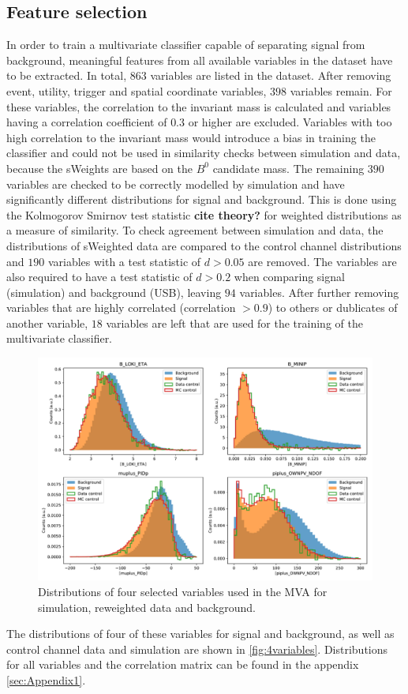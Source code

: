 \subsection{Feature selection}
In order to train a multivariate classifier capable of separating signal from background, meaningful features from all available variables in the dataset 
have to be extracted. In total, $\num{863}$ variables are listed in the dataset. After removing event, utility, trigger and spatial coordinate variables, $\num{398}$ variables remain.
For these variables, the correlation to the invariant mass is calculated and variables having a correlation coefficient of $\num{0.3}$ or higher are excluded.
Variables with too high correlation to the invariant mass would introduce a bias in training the classifier and could not be used in similarity checks between simulation and data,
because the sWeights are based on the $B^0$ candidate mass. The remaining $\num{390}$ variables are checked to be correctly modelled by simulation and have significantly different 
distributions for signal and background. This is done using the Kolmogorov Smirnov test statistic \textbf{cite theory?} for weighted distributions as a measure of similarity. 
To check agreement between simulation and data, the distributions of sWeighted data are compared to the control channel distributions and $\num{190}$ variables with a test statistic 
of $d > \num{0.05}$ are removed. The variables are also required to have a test statistic of $d > \num{0.2}$ when comparing signal (simulation) and background (USB), leaving 
$\num{94}$ variables. After further removing variables that are highly correlated (correlation $> 0.9$) to others or dublicates of another variable, $\num{18}$ variables are 
left that are used for the training of the multivariate classifier.
\begin{figure}
  \centering
  \includegraphics[width = .9\textwidth]{"content/plots/4variables.pdf"}
  \caption{Distributions of four selected variables used in the MVA for simulation, reweighted data and background.}
  \label{fig:4variables}
\end{figure}
The distributions of four of these variables for signal and background, as well as control channel data and simulation are shown in \autoref{fig:4variables}. Distributions for all
variables and the correlation matrix can be found in the appendix \ref{sec:Appendix1}.

